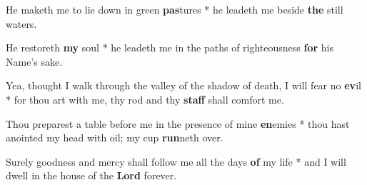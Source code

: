 \begin{multicols}{2}
	He maketh me to lie down in green \textbf{pas}tures * he leadeth me beside \textbf{the} still waters.
	
	He restoreth \textbf{my} soul * he leadeth me in the paths of righteousness \textbf{for} his Name's sake.
	
	Yea, thought I walk through the valley of the shadow of death, I will fear no \textbf{ev}il * for thou art with me, thy rod and thy \textbf{staff} shall comfort me.
	
	Thou preparest a table before me in the presence of mine \textbf{en}emies * thou hast anointed my head with oil; my cup \textbf{run}neth over.
	
	Surely goodness and mercy shall follow me all the days \textbf{of} my life * and I will dwell in the house of the \textbf{Lord} forever.
\end{multicols}